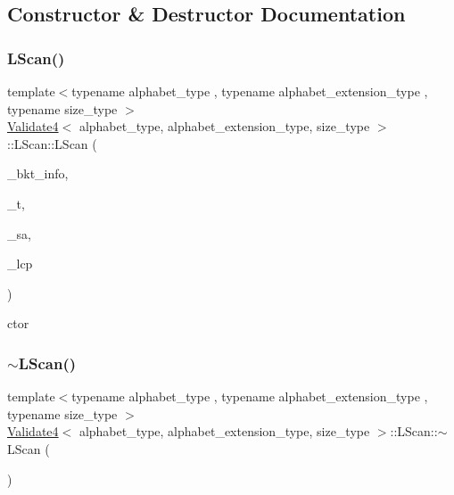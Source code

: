 \subsection{Constructor \& Destructor Documentation}
\mbox{\label{struct_validate4_1_1_l_scan_a8e95d99392cee99b081b8354d9a13757}} 
\subsubsection{\texorpdfstring{L\+Scan()}{LScan()}}
{\footnotesize\ttfamily template$<$typename alphabet\+\_\+type , typename alphabet\+\_\+extension\+\_\+type , typename size\+\_\+type $>$ \\
\hyperlink{class_validate4}{Validate4}$<$ alphabet\+\_\+type, alphabet\+\_\+extension\+\_\+type, size\+\_\+type $>$\+::L\+Scan\+::\+L\+Scan (\begin{DoxyParamCaption}\item[{\hyperlink{struct_validate4_1_1_bkt_info}{Bkt\+Info} \&}]{\+\_\+bkt\+\_\+info,  }\item[{\hyperlink{class_validate4_a49c80b3d101be19542a4341c2387603a}{alphabet\+\_\+vector\+\_\+type} $\ast$}]{\+\_\+t,  }\item[{\hyperlink{class_validate4_a46ea31a0a4b23f583806792160421d15}{size\+\_\+vector\+\_\+type} $\ast$}]{\+\_\+sa,  }\item[{\hyperlink{class_validate4_a46ea31a0a4b23f583806792160421d15}{size\+\_\+vector\+\_\+type} $\ast$}]{\+\_\+lcp }\end{DoxyParamCaption})\hspace{0.3cm}{\ttfamily [inline]}}



ctor 

\mbox{\label{struct_validate4_1_1_l_scan_a1ac7b38fcbb0968d0683a0df18fedd9f}} 
\subsubsection{\texorpdfstring{$\sim$\+L\+Scan()}{~LScan()}}
{\footnotesize\ttfamily template$<$typename alphabet\+\_\+type , typename alphabet\+\_\+extension\+\_\+type , typename size\+\_\+type $>$ \\
\hyperlink{class_validate4}{Validate4}$<$ alphabet\+\_\+type, alphabet\+\_\+extension\+\_\+type, size\+\_\+type $>$\+::L\+Scan\+::$\sim$\+L\+Scan (\begin{DoxyParamCaption}{ }\end{DoxyParamCaption})\hspace{0.3cm}{\ttfamily [inline]}}



